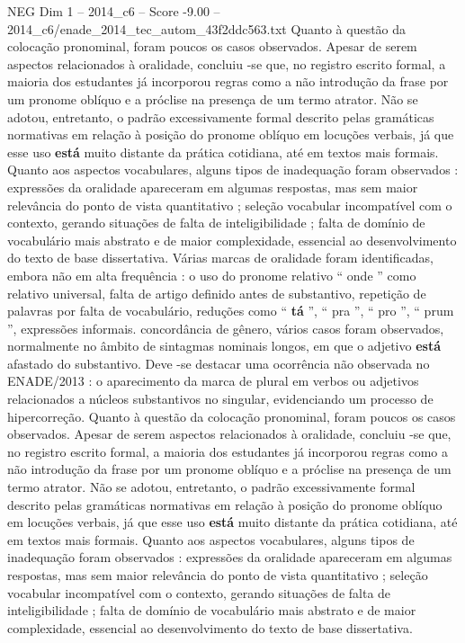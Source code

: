 \begin{textsample}{NEG Dim 1 – 2014\_c6 – Score -9.00 – 2014\_c6/enade\_2014\_tec\_autom\_43f2ddc563.txt}
Quanto à questão da colocação pronominal, foram poucos os casos observados.
Apesar de serem aspectos relacionados à oralidade, concluiu -se que, no registro escrito formal, a maioria dos estudantes já incorporou regras como a não introdução da frase por um pronome oblíquo e a próclise na presença de um termo atrator.
Não se adotou, entretanto, o padrão excessivamente formal descrito pelas gramáticas normativas em relação à posição do pronome oblíquo em locuções verbais, já que esse uso \textbf{está} muito distante da prática cotidiana, até em textos mais formais.
Quanto aos aspectos vocabulares, alguns tipos de inadequação foram observados : expressões da oralidade apareceram em algumas respostas, mas sem maior relevância do ponto de vista quantitativo ; seleção vocabular incompatível com o contexto, gerando situações de falta de inteligibilidade ; falta de domínio de vocabulário mais abstrato e de maior complexidade, essencial ao desenvolvimento do texto de base dissertativa.
Várias marcas de oralidade foram identificadas, embora não em alta frequência : o uso do pronome relativo “ onde ” como relativo universal, falta de artigo definido antes de substantivo, repetição de palavras por falta de vocabulário, reduções como “ \textbf{tá} ”, “ pra ”, “ pro ”, “ prum ”, expressões informais. concordância de gênero, vários casos foram observados, normalmente no âmbito de sintagmas nominais longos, em que o adjetivo \textbf{está} afastado do substantivo.
Deve -se destacar uma ocorrência não observada no ENADE/2013 : o aparecimento da marca de plural em verbos ou adjetivos relacionados a núcleos substantivos no singular, evidenciando um processo de hipercorreção.
Quanto à questão da colocação pronominal, foram poucos os casos observados.
Apesar de serem aspectos relacionados à oralidade, concluiu -se que, no registro escrito formal, a maioria dos estudantes já incorporou regras como a não introdução da frase por um pronome oblíquo e a próclise na presença de um termo atrator.
Não se adotou, entretanto, o padrão excessivamente formal descrito pelas gramáticas normativas em relação à posição do pronome oblíquo em locuções verbais, já que esse uso \textbf{está} muito distante da prática cotidiana, até em textos mais formais.
Quanto aos aspectos vocabulares, alguns tipos de inadequação foram observados : expressões da oralidade apareceram em algumas respostas, mas sem maior relevância do ponto de vista quantitativo ; seleção vocabular incompatível com o contexto, gerando situações de falta de inteligibilidade ; falta de domínio de vocabulário mais abstrato e de maior complexidade, essencial ao desenvolvimento do texto de base dissertativa.

\end{textsample}
